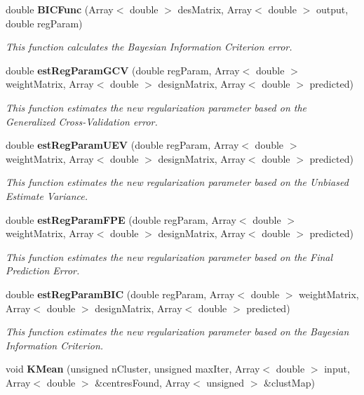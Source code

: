 \begin{CompactItemize}
double {\bf BICFunc} (Array$<$ double $>$ des\-Matrix, Array$<$ double $>$ output, double reg\-Param)
\begin{CompactList}\small\item\em This function calculates the Bayesian Information Criterion error. \item\end{CompactList}\item 
double {\bf est\-Reg\-Param\-GCV} (double reg\-Param, Array$<$ double $>$ weight\-Matrix, Array$<$ double $>$ design\-Matrix, Array$<$ double $>$ predicted)
\begin{CompactList}\small\item\em This function estimates the new regularization parameter based on the Generalized Cross-Validation error. \item\end{CompactList}\item 
double {\bf est\-Reg\-Param\-UEV} (double reg\-Param, Array$<$ double $>$ weight\-Matrix, Array$<$ double $>$ design\-Matrix, Array$<$ double $>$ predicted)
\begin{CompactList}\small\item\em This function estimates the new regularization parameter based on the Unbiased Estimate Variance. \item\end{CompactList}\item 
double {\bf est\-Reg\-Param\-FPE} (double reg\-Param, Array$<$ double $>$ weight\-Matrix, Array$<$ double $>$ design\-Matrix, Array$<$ double $>$ predicted)
\begin{CompactList}\small\item\em This function estimates the new regularization parameter based on the Final Prediction Error. \item\end{CompactList}\item 
double {\bf est\-Reg\-Param\-BIC} (double reg\-Param, Array$<$ double $>$ weight\-Matrix, Array$<$ double $>$ design\-Matrix, Array$<$ double $>$ predicted)
\begin{CompactList}\small\item\em This function estimates the new regularization parameter based on the Bayesian Information Criterion. \item\end{CompactList}\item 
void {\bf KMean} (unsigned n\-Cluster, unsigned max\-Iter, Array$<$ double $>$ input, Array$<$ double $>$ \&centres\-Found, Array$<$ unsigned $>$ \&clust\-Map)

\end{CompactItemize}
